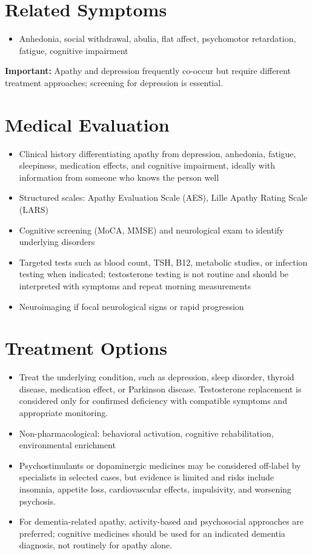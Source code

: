 \section*{Related Symptoms}
\begin{itemize}
 \item Anhedonia, social withdrawal, abulia, flat affect, psychomotor retardation, fatigue, cognitive impairment
\end{itemize}
\textbf{Important:} Apathy and depression frequently co-occur but require different treatment approaches; screening for depression is essential.

\section*{Medical Evaluation}
\begin{itemize}
 \item Clinical history differentiating apathy from depression, anhedonia, fatigue, sleepiness, medication effects, and cognitive impairment, ideally with information from someone who knows the person well
 \item Structured scales: Apathy Evaluation Scale (AES), Lille Apathy Rating Scale (LARS)
 \item Cognitive screening (MoCA, MMSE) and neurological exam to identify underlying disorders
 \item Targeted tests such as blood count, TSH, B12, metabolic studies, or infection testing when indicated; testosterone testing is not routine and should be interpreted with symptoms and repeat morning measurements
 \item Neuroimaging if focal neurological signs or rapid progression
\end{itemize}

\section*{Treatment Options}
\begin{itemize}
 \item Treat the underlying condition, such as depression, sleep disorder, thyroid disease, medication effect, or Parkinson disease. Testosterone replacement is considered only for confirmed deficiency with compatible symptoms and appropriate monitoring.
 \item Non-pharmacological: behavioral activation, cognitive rehabilitation, environmental enrichment
 \item Psychostimulants or dopaminergic medicines may be considered off-label by specialists in selected cases, but evidence is limited and risks include insomnia, appetite loss, cardiovascular effects, impulsivity, and worsening psychosis.
 \item For dementia-related apathy, activity-based and psychosocial approaches are preferred; cognitive medicines should be used for an indicated dementia diagnosis, not routinely for apathy alone.
\end{itemize}

